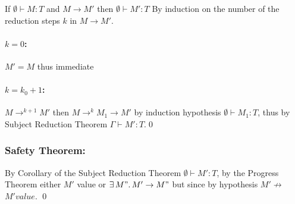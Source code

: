 If $\emptyset \vdash M: T$ and $M \to M'$ then $\emptyset \vdash M': T$
By induction on the number of the reduction steps $k$ in $M \to M'$.

\paragraph*{$k = 0$:} $M' = M$ thus immediate
\paragraph*{$k = k_0 + 1$:\\}
$M \to^{k+1} M'$ then $M \to^k M_1 \to M'$ by induction hypothesis $\emptyset \vdash M_1: T$,
thus by Subject Reduction Theorem $\Gamma \vdash M': T$.\qed

\subsubsection*{Safety Theorem:}

By Corollary of the Subject Reduction Theorem $\emptyset \vdash M': T$, by the Progress Theorem
either $M'$ value or $\exists\, M".\, M' \to M"$ but since by hypothesis $M' \not\to$ $M' value$.
\qed
